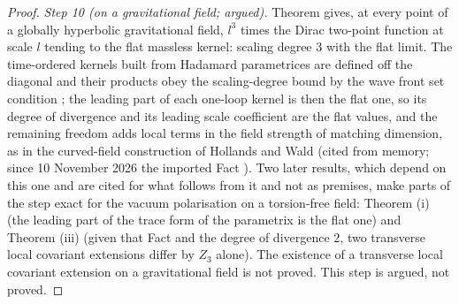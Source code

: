 \begin{proof}
\emph{Step 10 (on a gravitational field; argued).} Theorem  gives, at every point of a globally hyperbolic gravitational field, $l^{3}$ times the Dirac two-point function at scale $l$ tending to the flat massless kernel: scaling degree $3$ with the flat limit. The time-ordered kernels built from Hadamard parametrices are defined off the diagonal and their products obey the scaling-degree bound by the wave front set condition \cite{BrunettiFredenhagen2000}; the leading part of each one-loop kernel is then the flat one, so its degree of divergence and its leading scale coefficient are the flat values, and the remaining freedom adds local terms in the field strength of matching dimension, as in the curved-field construction of Hollands and Wald \cite{HollandsWald2001} (cited from memory; since 10 November 2026 the imported Fact ). Two later results, which depend on this one and are cited for what follows from it and not as premises, make parts of the step exact for the vacuum polarisation on a torsion-free field: Theorem (i) (the leading part of the trace form of the parametrix is the flat one) and Theorem (iii) (given that Fact and the degree of divergence $2$, two transverse local covariant extensions differ by $Z_{3}$ alone). The existence of a transverse local covariant extension on a gravitational field is not proved. This step is argued, not proved.
\end{proof}
